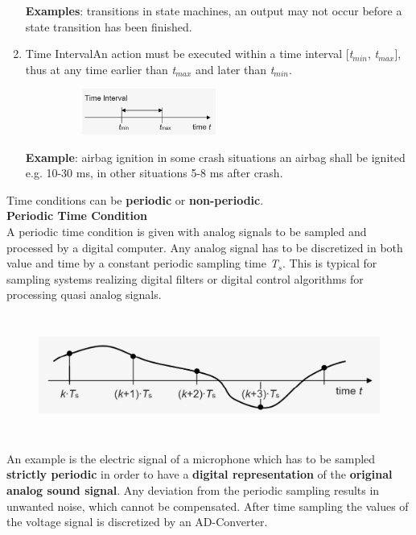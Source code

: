 \begin{enumerate}
\textbf{Examples}: transitions in state machines, an output may not occur before a state       transition has been finished.

\item  Time IntervalAn action must be executed within a time interval [\textit{t}${}_{min}$, \textit{t}${}_{max}$], thus at any time earlier than \textit{t}${}_{max}$ and later than\textit{ t}${}_{min}$. 

	\begin{figure}[h]
    \centering
    \includegraphics[width=6cm, height=1.5cm]{Images/image65.png}
    \label{fig:Fig }
    \end{figure}

\textbf{Example}:  airbag ignition in some crash situations an airbag shall be ignited      e.g. 10-30 ms, in other situations 5-8 ms after crash.
\end{enumerate}

Time conditions can be \textbf{periodic} or \textbf{non-periodic}. \\

{\rot\bf Periodic Time Condition }\\

A periodic time condition is given with analog signals to be sampled and processed by a digital computer. Any analog signal has to be discretized in both value and time by a constant periodic sampling time \textit{T}${}_{s}$. This is typical for sampling systems realizing digital filters or digital control algorithms for processing quasi analog signals.

	\begin{figure}[h]
    \centering
    \includegraphics[width=12cm, height=4cm]{Images/image66.png}
    \label{fig:Fig }
    \end{figure}

An example is the electric signal of a microphone which has to be sampled \textbf{strictly periodic} in order to have a \textbf{digital representation} of the \textbf{original analog sound signal}. Any deviation from the periodic sampling results in unwanted noise, which cannot be compensated. After time sampling the values of the voltage signal is discretized by an AD-Converter.\\

